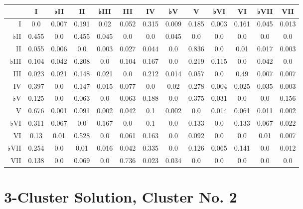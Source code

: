 \begin{table}[htbp]
\begin{minipage}{\linewidth}
\setlength{\tymax}{0.5\linewidth}
\centering
\small
\begin{tabulary}{\textwidth}{@{}RCCCCCCCCCCCC@{}} \toprule
&I&♭II&II&♭III&III&IV&♭V&V&♭VI&VI&♭VII&VII\\
\midrule
I&0.0&0.007&0.191&0.02&0.052&0.315&0.009&0.185&0.003&0.161&0.045&0.013\\
♭II&0.455&0.0&0.455&0.045&0.0&0.0&0.045&0.0&0.0&0.0&0.0&0.0\\
II&0.055&0.006&0.0&0.003&0.027&0.044&0.0&0.836&0.0&0.01&0.017&0.003\\
♭III&0.104&0.042&0.208&0.0&0.104&0.167&0.0&0.219&0.115&0.0&0.042&0.0\\
III&0.023&0.021&0.148&0.021&0.0&0.212&0.014&0.057&0.0&0.49&0.007&0.007\\
IV&0.397&0.0&0.147&0.015&0.077&0.0&0.02&0.278&0.004&0.025&0.035&0.003\\
♭V&0.125&0.0&0.063&0.0&0.063&0.188&0.0&0.375&0.031&0.0&0.0&0.156\\
V&0.676&0.001&0.091&0.002&0.042&0.1&0.002&0.0&0.014&0.061&0.011&0.002\\
♭VI&0.311&0.067&0.0&0.167&0.0&0.1&0.0&0.133&0.0&0.133&0.067&0.022\\
VI&0.13&0.01&0.528&0.0&0.061&0.163&0.0&0.092&0.0&0.0&0.01&0.007\\
♭VII&0.254&0.0&0.01&0.016&0.042&0.335&0.0&0.126&0.065&0.141&0.0&0.012\\
VII&0.138&0.0&0.069&0.0&0.736&0.023&0.034&0.0&0.0&0.0&0.0&0.0\\

\bottomrule

\end{tabulary}
\end{minipage}
\end{table}

\section{3-Cluster Solution, Cluster No. 2}
\label{3-clustersolutionclusterno.2}

